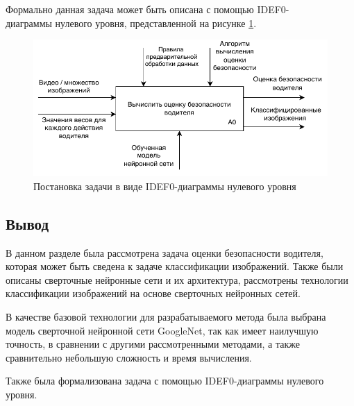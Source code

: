 Формально данная задача может быть описана с помощью IDEF0-\\диаграммы нулевого уровня, представленной на рисунке \ref{fig:idef0}.
 \begin{figure}[hbtp]
	\centering
	\includegraphics[width=\textwidth]{img/idef0.pdf}
	\caption{Постановка задачи в виде IDEF0-диаграммы нулевого уровня}
	\label{fig:idef0}
\end{figure}
\clearpage

\subsection*{Вывод}
В данном разделе была рассмотрена задача оценки безопасности водителя, которая может быть сведена к задаче классификации изображений. Также были описаны сверточные нейронные сети и их архитектура, рассмотрены технологии классификации изображений на основе сверточных нейронных сетей.

В качестве базовой технологии для разрабатываемого метода была выбрана модель сверточной нейронной сети GoogleNet, так как имеет наилучшую точность, в сравнении с другими рассмотренными методами, а также сравнительно небольшую сложность и время вычисления.

Также была формализована задача с помощью  IDEF0-диаграммы нулевого уровня.

\pagebreak